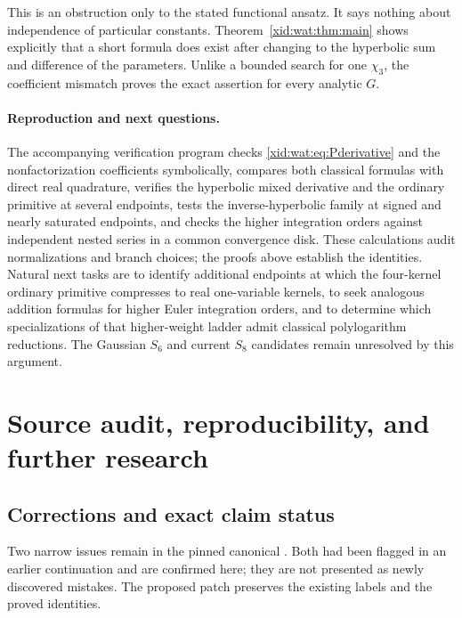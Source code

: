 \documentclass[11pt,a4paper]{article}
\numberwithin{equation}{section}
\theoremstyle{definition}
\theoremstyle{remark}
\begin{document}
This is an obstruction only to the stated functional ansatz. It says
nothing about independence of particular constants. Theorem~\ref{xid:wat:thm:main}
shows explicitly that a short formula does exist after changing to
the hyperbolic sum and difference of the parameters.
Unlike a bounded search for one $\chi_3$, the coefficient mismatch
proves the exact assertion for every analytic $G$.

\paragraph{Reproduction and next questions.}
The accompanying verification program checks
\eqref{xid:wat:eq:Pderivative} and the nonfactorization coefficients
symbolically, compares both classical formulas with direct real
quadrature, verifies the hyperbolic mixed derivative and the
ordinary primitive at several endpoints,
tests the inverse-hyperbolic family at signed and nearly saturated
endpoints, and checks the higher integration orders against independent nested
series in a common convergence disk. These calculations audit
normalizations and branch choices; the proofs above establish the
identities. Natural next tasks are to identify additional endpoints
at which the four-kernel ordinary primitive compresses to real
one-variable kernels, to seek analogous addition formulas for higher
Euler integration orders, and to determine which specializations
of that higher-weight ladder admit classical polylogarithm reductions.
The Gaussian $S_6$ and current $S_8$
candidates remain unresolved by this argument.



\section{Source audit, reproducibility, and further research}
\label{xid:sec:audit}

\subsection{Corrections and exact claim status}

Two narrow issues remain in the pinned canonical
. Both had been flagged in an earlier
continuation and are confirmed here; they are not presented as newly
discovered mistakes. The proposed patch preserves the existing labels
and the proved identities.
\end{document}
